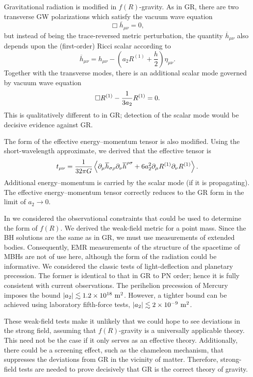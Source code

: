 Gravitational radiation is modified in $f(R)$-gravity. As in GR, there are two transverse GW polarizations which satisfy the vacuum wave equation
\begin{equation}
\Box \overline{h}_{\mu\nu} = 0,
\end{equation}
but instead of being the trace-reversed metric perturbation, the quantity $\overline{h}_{\mu\nu}$ also depends upon the (first-order) Ricci scalar according to
\begin{equation}
\overline{h}_{\mu\nu} = h_{\mu\nu} - \left(a_2 R^{(1)} + \dfrac{h}{2}\right)\eta_{\mu\nu}.
\end{equation}
Together with the transverse modes, there is an additional scalar mode governed by vacuum wave equation
\begin{equation}
\Box R^{(1)} - \dfrac{1}{3 a_2} R^{(1)} = 0.
\end{equation}
This is qualitatively different to in GR; detection of the scalar mode would be decisive evidence against GR.

The form of the effective energy--momentum tensor is also modified. Using the short-wavelength approximate, we derived that the effective tensor is
\begin{equation}
t_{\mu\nu} = \dfrac{1}{32\pi G}\left\langle \partial_\mu\overline{h}_{\sigma\rho}\partial_\nu\overline{h}^{\rho\sigma} + 6a_2^2\partial_\mu R^{(1)}\partial_\nu R^{(1)} \right\rangle.
\end{equation}
Additional energy--momentum is carried by the scalar mode (if it is propagating). The effective energy--momentum tensor correctly reduces to the GR form in the limit of $a_2 \rightarrow 0$.

In  we considered the observational constraints that could be used to determine the form of $f(R)$. We derived the weak-field metric for a point mass. Since the BH solutions are the same as in GR, we must use measurements of extended bodies. Consequently, EMR measurements of the structure of the spacetime of MBHs are not of use here, although the form of the radiation could be informative. We considered the classic tests of light-deflection and planetary precession. The former is identical to that in GR to PN order; hence it is fully consistent with current observations. The perihelion precession of Mercury imposes the bound $|a_2| \lesssim 1.2 \times 10^{18}~\mathrm{m^2}$. However, a tighter bound can be achieved using laboratory fifth-force tests, $|a_2| \lesssim 2 \times 10^{-9}~\mathrm{m^2}$.

These weak-field tests make it unlikely that we could hope to see deviations in the strong field, assuming that $f(R)$-gravity is a universally applicable theory. This need not be the case if it only serves as an effective theory. Additionally, there could be a screening effect, such as the chameleon mechanism, that suppresses the deviations from GR in the vicinity of matter. Therefore, strong-field tests are needed to prove decisively that GR is the correct theory of gravity.

